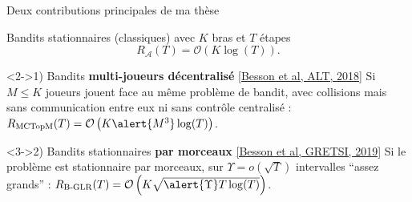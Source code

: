 \documentclass[11pt,english,ignorenonframetext,]{beamer}
\begin{document}
\begin{frame}{Deux contributions principales de ma thèse}

\begin{exampleblock}{Bandits stationnaires (classiques) avec $K$ bras et $T$ étapes}
  \[ R_{\mathcal{A}}(T) = \mathcal{O}\left( K \log(T) \right). \]
\end{exampleblock}


\begin{block}<2->{1) Bandits \textbf{multi-joueurs décentralisé} \hspace*{40pt} \href{https://arxiv.org/abs/1711.02317}{[Besson et al, ALT, 2018]}}
  Si \alert{$M \leq K$ joueurs} jouent face au même problème de bandit, \alert{avec collisions} mais sans communication entre eux ni sans contrôle centralisé :
  $R_{\mathrm{MCTopM}}(T) = \mathcal{O}\left( K \alert{M^3} \log(T) \right)$.
\end{block}




\begin{block}<3->{2) Bandits stationnaires \textbf{par morceaux} \hspace*{25pt} \href{https://arxiv.org/abs/1902.01575}{[Besson et al, GRETSI, 2019]}}
  Si le problème est \alert{stationnaire par morceaux, sur $\Upsilon = o(\sqrt{T})$ intervalles ``assez grands''} :
  $R_{\mathrm{B}\text{-}\mathrm{GLR}}(T) = \mathcal{O}\left( K \sqrt{\alert{\Upsilon} T \log(T)} \right)$.
\end{block}

\end{frame}
\end{document}
